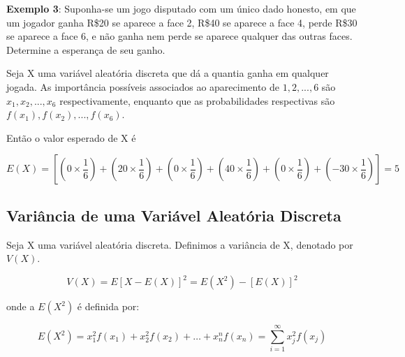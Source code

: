 \textbf{Exemplo 3}: Suponha-se um jogo disputado com um único dado
honesto, em que um jogador ganha R\$20 se aparece a face 2, R\$40
se aparece a face 4, perde R\$30 se aparece a face 6, e não ganha
nem perde se aparece qualquer das outras faces. Determine a
esperança de seu ganho.\vskip0.3cm

Seja X uma variável aleatória discreta que dá a quantia ganha em
qualquer jogada. As importância possíveis associados ao
aparecimento de $1,2,...,6$ são $x_{1},x_{2},...,x_{6}$
respectivamente, enquanto que as probabilidades respectivas são \\ 
$f(x_{1}),f(x_{2}),...,f(x_{6})$.



\vskip0.3cm

Então o valor esperado de X é

$$
E(X)= \left[\left(0 \times \frac{1}{6}\right)+\left(20 \times
\frac{1}{6}\right)+ \left(0 \times \frac{1}{6}\right)+ \left(40
\times \frac{1}{6}\right)+\left(0 \times
\frac{1}{6}\right)+\left(-30 \times \frac{1}{6}\right)\right]=5
$$



\subsection{Variância de uma Variável Aleatória Discreta}

Seja X uma variável aleatória discreta. Definimos a variância de
X, denotado por $V(X)$.

\begin{equation}\label{v(x)}
    V(X) = E[X-E(X)]^{2} = E(X^{2})-[E(X)]^{2}
\end{equation}

onde a $E(X^{2})$ é definida por:

\begin{equation}\label{e(x)}
    E(X^{2}) = x_{1}^{2}f(x_{1})+x_{2}^{2}f(x_{2})+\ldots+x_{n}^{n}f(x_{n})= \sum_{i=1}^{\infty} x_{j}^{2}f(x_{j})
\end{equation}



